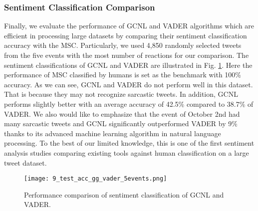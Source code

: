 \documentclass[conference]{IEEEtran}
\begin{document}
	\subsubsection{Sentiment Classification Comparison} Finally, we evaluate the performance of GCNL and VADER algorithms which are efficient in processing large datasets by comparing their sentiment classification accuracy with the MSC. Particularly, we used 4,850 randomly selected tweets from the five events with the most number of reactions for our comparison. The sentiment classifications of GCNL and VADER are illustrated in Fig. \ref{fig:3_human_vader_gg_sentiment}. Here the performance of MSC  classified by humans is set as the benchmark with 100\% accuracy. As we can see, GCNL and VADER do not perform well in this dataset. That is because they may not recognize sarcastic tweets. In addition, GCNL performs slightly better with an average accuracy of 42.5\% compared to 38.7\% of VADER. We also would like to emphasize that the event of October 2nd had many sarcastic tweets and GCNL significantly outperformed VADER by 9\% thanks to its advanced machine learning algorithm in natural language processing. To the best of our limited knowledge, this is one of the first sentiment analysis studies comparing existing tools against human classification on a large tweet dataset.
	
	
	\begin{figure}[tb]
		\centering
		\texttt{[image: 9\_test\_acc\_gg\_vader\_5events.png]} 
		
		\caption{Performance comparison of sentiment classification of GCNL and VADER. }
		\label{fig:3_human_vader_gg_sentiment} 
		\vspace{-0.2in}
	\end{figure}
	
\end{document}
